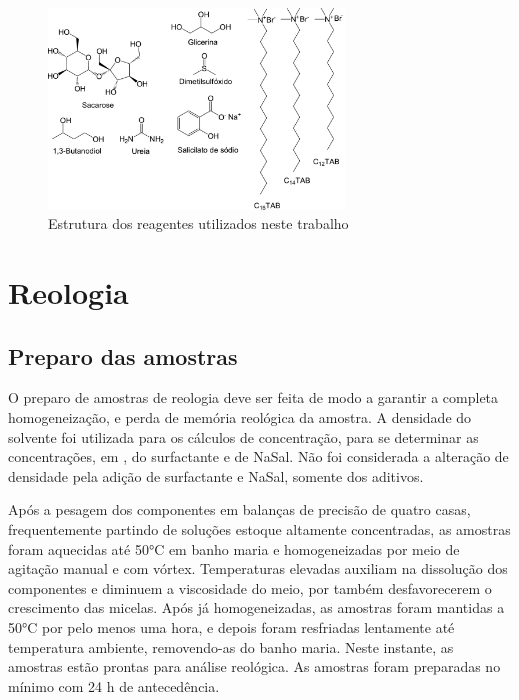 	\begin{figure}[h]
		\centering
		\includegraphics[width=0.7\textwidth]{imagens/introducao/reagentes}
		\caption{Estrutura dos reagentes utilizados neste trabalho}
		\label{fig:reagentes}
	\end{figure}
	
	\FloatBarrier
	
	
	
	\chapter{Reologia}
		\section{Preparo das amostras}
		\label{sec:reologia_preparo_amostra}
		O preparo de amostras de reologia deve ser feita de modo a garantir a completa homogeneização, e perda de memória reológica da amostra. A densidade do solvente foi utilizada para os cálculos de concentração, para se determinar as concentrações, em \mM, do surfactante e de NaSal. Não foi considerada a alteração de densidade pela adição de surfactante e NaSal, somente dos aditivos.
		
		Após a pesagem dos componentes em balanças de precisão de quatro casas, frequentemente partindo de soluções estoque altamente concentradas, as amostras foram aquecidas até 50°C em banho maria e homogeneizadas por meio de agitação manual e com vórtex. Temperaturas elevadas auxiliam na dissolução dos componentes e diminuem a viscosidade do meio, por também desfavorecerem o crescimento das micelas. Após já homogeneizadas, as amostras foram mantidas a 50°C por pelo menos uma hora, e depois foram resfriadas lentamente até temperatura ambiente, removendo-as do banho maria. Neste instante, as amostras estão prontas para análise reológica. As amostras foram preparadas no mínimo com 24 h de antecedência.
		
